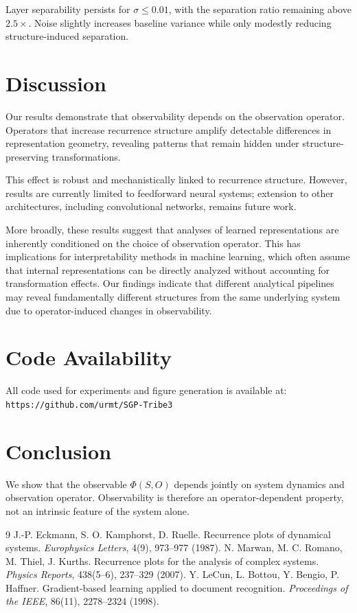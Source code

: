 \documentclass[11pt]{article}
\begin{document}
Layer separability persists for $\sigma \leq 0.01$, with the separation ratio remaining above $2.5\times$. Noise slightly increases baseline variance while only modestly reducing structure-induced separation.

\section{Discussion}

Our results demonstrate that observability depends on the observation operator. Operators that increase recurrence structure amplify detectable differences in representation geometry, revealing patterns that remain hidden under structure-preserving transformations.

This effect is robust and mechanistically linked to recurrence structure. However, results are currently limited to feedforward neural systems; extension to other architectures, including convolutional networks, remains future work.

More broadly, these results suggest that analyses of learned representations are inherently conditioned on the choice of observation operator. This has implications for interpretability methods in machine learning, which often assume that internal representations can be directly analyzed without accounting for transformation effects. Our findings indicate that different analytical pipelines may reveal fundamentally different structures from the same underlying system due to operator-induced changes in observability.

\section*{Code Availability}
All code used for experiments and figure generation is available at:
\texttt{https://github.com/urmt/SGP-Tribe3}

\section{Conclusion}

We show that the observable $\Phi(S, O)$ depends jointly on system dynamics and observation operator. Observability is therefore an operator-dependent property, not an intrinsic feature of the system alone.

\begin{thebibliography}{9}
	J.-P. Eckmann, S. O. Kamphorst, D. Ruelle.
	Recurrence plots of dynamical systems.
	\textit{Europhysics Letters}, 4(9), 973--977 (1987).
	N. Marwan, M. C. Romano, M. Thiel, J. Kurths.
	Recurrence plots for the analysis of complex systems.
	\textit{Physics Reports}, 438(5--6), 237--329 (2007).
	Y. LeCun, L. Bottou, Y. Bengio, P. Haffner.
	Gradient-based learning applied to document recognition.
	\textit{Proceedings of the IEEE}, 86(11), 2278--2324 (1998).
\end{thebibliography}
\end{document}
